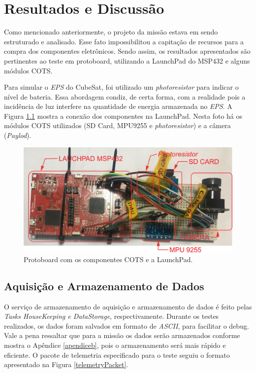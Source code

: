 \chapter[Resultados e Discussão]{Resultados e Discussão}

Como mencionado anteriormente, o projeto da missão estava em sendo estruturado e analisado. Esse fato impossibilitou a capitação de recursos para a compra dos componentes eletrônicos. Sendo assim, os resultados apresentados são pertinentes ao teste em protoboard, utilizando a LaunchPad do MSP432 e alguns módulos COTS.

Para simular o \textit{EPS} do CubeSat, foi utilizado um \textit{photoresistor} para indicar o nível de bateria. Essa abordagem condiz, de certa forma, com a realidade pois a incidência de luz interfere na quantidade de energia armazenada no \textit{EPS}. A Figura \ref{protoboardCompleteDetail} mostra a conexão dos componentes na LaunchPad. Nesta foto há os módulos COTS utilizados (SD Card, MPU9255 e \textit{photoresistor}) e a câmera (\textit{Paylod}).

\begin{figure}[h]
	\centering
	\caption{Protoboard com os componentes COTS e a LaunchPad.}
	\includegraphics[keepaspectratio=true,scale=0.57]{figuras/protoboardCompleteDetail.png}
	
	\label{protoboardCompleteDetail}
\end{figure}
\FloatBarrier

\section{Aquisição e Armazenamento de Dados}

O serviço de armazenamento de aquisição e armazenamento de dados é feito pelas \textit{Tasks HouseKeeping e DataStorage}, respectivamente. Durante os testes realizados, os dados foram salvados em formato de \textit{ASCII}, para facilitar o debug. Vale a pena ressaltar que para a missão os dados serão armazenados conforme mostra o Apêndice \ref{apendiceb}, pois o armazenamento será mais rápido e eficiente. O pacote de telemetria especificado para o teste seguiu o formato apresentado na Figura \ref{telemetryPacket}.


